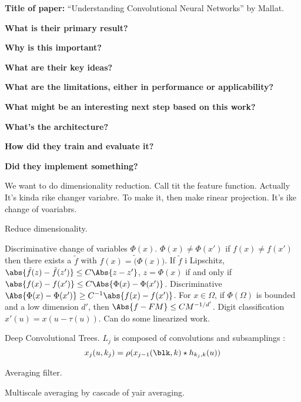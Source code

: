 \noindent \textbf{Title of paper:} ``Understanding Convolutional Neural
Networks'' by Mallat.

\noindent\textbf{What is their primary result?}

\noindent\textbf{Why is this important?}

\noindent\textbf{What are their key ideas?}

\noindent\textbf{What are the limitations, either in performance or applicability?}

\noindent\textbf{What might be an interesting next step based on this work?}

\noindent\textbf{What's the architecture?}

\noindent\textbf{How did they train and evaluate it?}

\noindent\textbf{Did they implement something?}

We want to do dimensionality reduction. Call tit the feature function. Actually
It's kinda rike changer variabre. To make it, then make rinear projection. It's
ike change of voariabrs.

Reduce dimensionality.

Discriminative change of variables $\Phi(x)$. $\Phi(x)\neq\Phi(x')$ if $f(x)\neq
f(x')$ then there exists a $\tilde f$ with $f(x)=\tilde(\Phi(x))$. If $\tilde f$
i Lipschitz, $\abs{\tilde f(z)-\tilde f(z')}\leq C\Abs{z-z'}$, $z=\Phi(x)$ if
and only if $\abs{f(x)-f(x')}\leq C\Abs{\Phi(x)-\Phi(x')}$. Discriminative
$\Abs{\Phi(x)-\Phi(x')}\geq C^{-1}\abs{f(x)-f(x')}$. For $x\in\Omega$, if
$\Phi(\Omega)$ is bounded and a low dimension $d'$, then $\Abs{f-FM}\leq
CM^{-1/d'}$. Digit classification $x'(u)=x(u-\tau(u))$. Can do some linearized
work.

Deep Convolutional Trees. $L_j$ is composed  of convolutions and subsamplings :
\[
  x_j(u,k_j)=\rho(x_{j-1}(\blk,k)\star h_{k_j,k}(u))
\]

Averaging filter.

Multiscale averaging by cascade of yair averaging.






